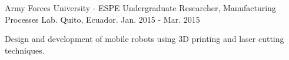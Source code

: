 \begin{cventries}
  \cventry
    {Army Forces University - ESPE}
    {Undergraduate Researcher, Manufacturing Processes Lab.}
    {Quito, Ecuador.}
    {Jan. 2015 - Mar. 2015}
    {
      \begin{cvitems}
        \item {Design and development of mobile robots using 3D printing and laser cutting techniques.}
      \end{cvitems}
    }
        
\end{cventries}
